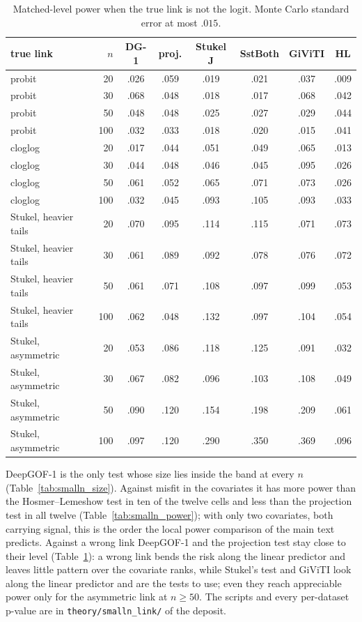 \begin{table}[h]
\centering
\caption{Matched-level power when the true link is not the logit. Monte Carlo standard error at most $.015$.}
\label{tab:smalln_link}
\small
\begin{tabular}{@{}lrcccccc@{}}
\toprule
true link & $n$ & DG-1 & proj. & Stukel J & SstBoth & GiViTI & HL \\
\midrule
probit & 20 & .026 & .059 & .019 & .021 & .037 & .009 \\
probit & 30 & .068 & .048 & .018 & .017 & .068 & .042 \\
probit & 50 & .048 & .048 & .025 & .027 & .029 & .044 \\
probit & 100 & .032 & .033 & .018 & .020 & .015 & .041 \\
cloglog & 20 & .017 & .044 & .051 & .049 & .065 & .013 \\
cloglog & 30 & .044 & .048 & .046 & .045 & .095 & .026 \\
cloglog & 50 & .061 & .052 & .065 & .071 & .073 & .026 \\
cloglog & 100 & .032 & .045 & .093 & .105 & .093 & .033 \\
Stukel, heavier tails & 20 & .070 & .095 & .114 & .115 & .071 & .073 \\
Stukel, heavier tails & 30 & .061 & .089 & .092 & .078 & .076 & .072 \\
Stukel, heavier tails & 50 & .061 & .071 & .108 & .097 & .099 & .053 \\
Stukel, heavier tails & 100 & .062 & .048 & .132 & .097 & .104 & .054 \\
Stukel, asymmetric & 20 & .053 & .086 & .118 & .125 & .091 & .032 \\
Stukel, asymmetric & 30 & .067 & .082 & .096 & .103 & .108 & .049 \\
Stukel, asymmetric & 50 & .090 & .120 & .154 & .198 & .209 & .061 \\
Stukel, asymmetric & 100 & .097 & .120 & .290 & .350 & .369 & .096 \\
\bottomrule
\end{tabular}
\end{table}

DeepGOF-1 is the only test whose size lies inside the band at every $n$
(Table~\ref{tab:smalln_size}). Against misfit in the covariates it has more power than the Hosmer--Lemeshow
test in ten of the twelve cells and less than the projection test in all twelve
(Table~\ref{tab:smalln_power}); with only two covariates, both carrying signal, this is the order the local
power comparison of the main text predicts. Against a wrong link DeepGOF-1 and the projection test stay close
to their level (Table~\ref{tab:smalln_link}): a wrong link bends the risk along the linear predictor and
leaves little pattern over the covariate ranks, while Stukel's test and GiViTI look along the linear
predictor and are the tests to use; even they reach appreciable power only for the asymmetric link at
$n\ge50$. The scripts and every per-dataset p-value are in \texttt{theory/smalln\_link/} of the deposit.
